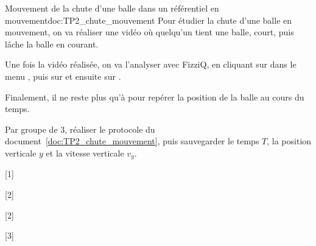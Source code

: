 \begin{doc}{Mouvement de la chute d'une balle dans un référentiel en mouvement}{doc:TP2_chute_mouvement}
  Pour étudier la chute d'une balle en mouvement, on va réaliser une vidéo où quelqu'un tient une balle, court, puis lâche la balle en courant.
  
  Une fois la vidéo réalisée, on va l'analyser avec FizziQ, en cliquant sur  dans le menu , puis sur  et ensuite sur .
  
  Finalement, il ne reste plus qu'à  pour repérer la position de la balle au cours du temps.
\end{doc}

\mesure Par groupe de 3, réaliser le protocole du document~\ref{doc:TP2_chute_mouvement}, puis sauvegarder le temps $T$, la position verticale $y$ et la vitesse verticale $v_y$.

[1]

[2]

[2]

[3]